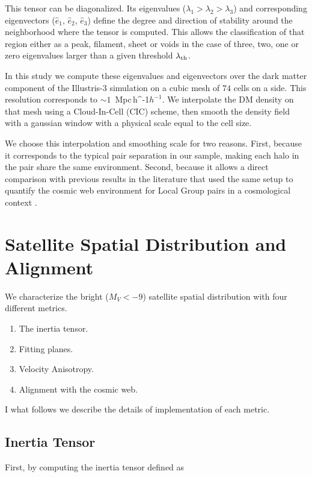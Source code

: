 \documentclass[a4paper,fleqn,usenatbib]{mnras}
\newcommand{\Mpch}{\,{\rm Mpc}\,\ifmmode h^{-1}\else $h^{-1}$\fi}
\begin{document}
This tensor can be diagonalized.
Its eigenvalues ($\lambda_1 > \lambda_2 > \lambda_3$) and
corresponding eigenvectors ($\hat{e}_1$, $\hat{e}_2$, $\hat{e}_3$)
define the degree and direction of stability around the neighborhood
where the tensor is computed. 
This allows the classification of that region either as a peak,
filament, sheet or voids in the case of three, two, one or zero
eigenvalues larger than a given threshold $\lambda_{\rm th}$.

In this study we compute these eigenvalues and eigenvectors over the
dark matter component of the Illustris-3 simulation on a cubic mesh of
$74$ cells on a side. 
This resolution corresponds to $\sim 1$ \Mpch.
We interpolate the DM density on that mesh using a Cloud-In-Cell (CIC)
scheme, then smooth the density field with a gaussian window with a
physical scale equal to the cell size. 

We choose this interpolation and smoothing scale for two reasons.
First, because it corresponds to the typical pair separation in our
sample, making each halo in the pair share the same environment.
Second, because it allows a direct comparison with previous results in
the literature that used the same setup to quantify the cosmic
web environment for Local Group pairs in a cosmological context
\citep{ForeroRomero2013,2015ApJ...799...45F}.  

\section{Satellite Spatial Distribution and Alignment}
\label{sec:SpatialMeasurements}

We characterize the bright ($M_V<-9$) satellite spatial distribution
with four different metrics. 

\begin{enumerate}
\item{The inertia tensor}.
\item{Fitting planes}.
\item{Velocity Anisotropy}.
\item{Alignment with the cosmic web}. 
\end{enumerate}

I what follows we describe the details of implementation of each
metric.


\subsection{Inertia Tensor}
\label{sub:inertia}
First, by computing the inertia tensor defined as 
\end{document}
